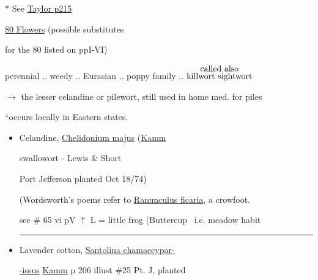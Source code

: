 \documentclass[a4paper,10pt]{article}
\begin{document}
\color{blue}
\begin{flushright}
\par
\end{flushright}
\begin{flushleft}
\color{red} 
\begin{turn}{25}%
* See \ul{Taylor p215} 
\end{turn}
\ul{80 Flowers} (possible substitutes\par
\color{red}for the 80 listed on ppI-VI) \hfill \color{blue} \par

\color{red}
\small
{} perennial .. weedy .. Eurasian .. poppy family .. {$\stackrel{\hbox{called also}}{\hbox{killwort sightwort}}$}\par
 $\rightarrow$ the lesser celandine or pilewort, still used in home med. for piles\par
``occurs locally in Eastern states.\par
\begin{itemize}
\color{blue}
\normalsize
\item Celandine, \ul{Chelidonium majus} (\ul{Kamm}\par
\tiny 
\color{red}
swallowort - Lewis \& Short\par
\color{blue}
\normalsize
\color{red}
 \color{blue}Port Jefferson planted Oct 18/74)\par
\color{red}
\small
{} (Wordsworth's poems refer to \ul{Ranunculus ficaria}, a crowfoot.\par
see \# 65 vi pV 
\color{blue}
$\uparrow$ L = little frog (Buttercup \ i.e. meadow habit
\rule{10cm}{0.01cm}
\normalsize
\item Lavender cotton, \ul{Santolina chamaecypar-} \par
\ul{-issus} \ul{Kamm} p 206 illust \#25 Pt. J, planted\par 
\color{red}
\tiny
\newsavebox{\abc}
\end{itemize}
\end{flushleft}
\end{document}
